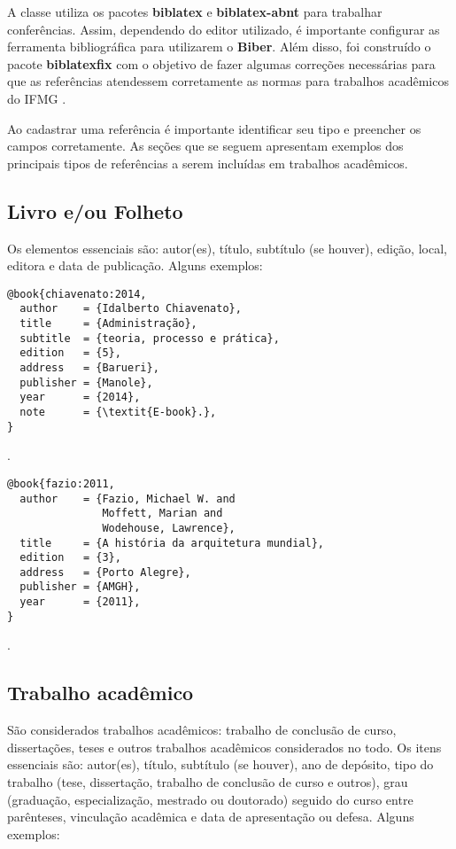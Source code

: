 A classe {\iftex} utiliza os pacotes \textbf{biblatex} e \textbf{biblatex-abnt} para trabalhar conferências.
Assim, dependendo do editor utilizado, é importante configurar as ferramenta bibliográfica para utilizarem o \textbf{Biber}.
Além disso, foi construído o pacote \textbf{biblatexfix} com o objetivo de fazer algumas correções necessárias para que as referências atendessem corretamente as normas para trabalhos acadêmicos do IFMG \cite{ifmg:2020:manual}.

Ao cadastrar uma referência é importante identificar seu tipo e preencher os campos corretamente.
As seções que se seguem apresentam exemplos dos principais tipos de referências a serem incluídas em trabalhos acadêmicos.

\subsection{Livro e/ou Folheto}

Os elementos essenciais são: autor(es), título, subtítulo (se houver), edição, local, editora e data de publicação.
Alguns exemplos:

\vspace*{1em}

\begin{verbatim}
@book{chiavenato:2014,
  author    = {Idalberto Chiavenato},
  title     = {Administração},
  subtitle  = {teoria, processo e prática},
  edition   = {5},
  address   = {Barueri},
  publisher = {Manole},
  year      = {2014},
  note      = {\textit{E-book}.},
}
\end{verbatim}

\noindent
{}.

\vspace*{1em}

\begin{verbatim}
@book{fazio:2011,
  author    = {Fazio, Michael W. and
               Moffett, Marian and
               Wodehouse, Lawrence},
  title     = {A história da arquitetura mundial},
  edition   = {3},
  address   = {Porto Alegre},
  publisher = {AMGH},
  year      = {2011},
}
\end{verbatim}

\noindent
{}.

\subsection{Trabalho acadêmico}

São considerados trabalhos acadêmicos: trabalho de conclusão de curso, dissertações, teses e outros trabalhos acadêmicos considerados no todo.
Os itens essenciais são: autor(es), título, subtítulo (se houver), ano de depósito, tipo do trabalho (tese, dissertação, trabalho de conclusão de curso e outros), grau (graduação, especialização, mestrado ou doutorado) seguido do curso entre parênteses, vinculação acadêmica e data de apresentação ou defesa.
Alguns exemplos:

